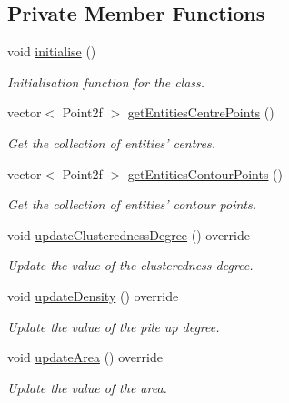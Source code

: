 \subsection*{Private Member Functions}
\begin{DoxyCompactItemize}
\item 
void \hyperlink{classmultiscale_1_1analysis_1_1Cluster_a3af6980def4fbfea38ccd86620f127f8}{initialise} ()
\begin{DoxyCompactList}\small\item\em Initialisation function for the class. \end{DoxyCompactList}\item 
vector$<$ Point2f $>$ \hyperlink{classmultiscale_1_1analysis_1_1Cluster_af24261b08126bc2d2f51144056c6d353}{get\-Entities\-Centre\-Points} ()
\begin{DoxyCompactList}\small\item\em Get the collection of entities' centres. \end{DoxyCompactList}\item 
vector$<$ Point2f $>$ \hyperlink{classmultiscale_1_1analysis_1_1Cluster_adbb1a108b2ae638fbba0450c7f7fee20}{get\-Entities\-Contour\-Points} ()
\begin{DoxyCompactList}\small\item\em Get the collection of entities' contour points. \end{DoxyCompactList}\item 
void \hyperlink{classmultiscale_1_1analysis_1_1Cluster_a2279d1567eec7c0b1e29cae26cfb4d73}{update\-Clusteredness\-Degree} () override
\begin{DoxyCompactList}\small\item\em Update the value of the clusteredness degree. \end{DoxyCompactList}\item 
void \hyperlink{classmultiscale_1_1analysis_1_1Cluster_ac0300d9d05b0eb3aecd5724a14c2da41}{update\-Density} () override
\begin{DoxyCompactList}\small\item\em Update the value of the pile up degree. \end{DoxyCompactList}\item 
void \hyperlink{classmultiscale_1_1analysis_1_1Cluster_a3128a3b20c28619ccdd6a25208b8c83e}{update\-Area} () override
\begin{DoxyCompactList}\small\item\em Update the value of the area. \end{DoxyCompactList}\item 

\end{DoxyCompactItemize}

